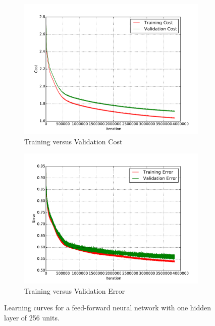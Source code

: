 \begin{figure}
	\centering
	\begin{subfigure}[b]{0.45\linewidth}
		\centering
		\includegraphics[width=\linewidth]{images/1/train_val_cost.pdf}
		\caption{Training versus Validation Cost}
	\end{subfigure}
	\hfill
	\begin{subfigure}[b]{0.45\linewidth}
		\centering
		\includegraphics[width=\linewidth]{images/1/train_val_error.pdf}
		\caption{Training versus Validation Error}
	\end{subfigure}
	\caption{Learning curves for a feed-forward neural network with one hidden layer of 256 units.}
	\label{shrine1_curves}
\end{figure}
